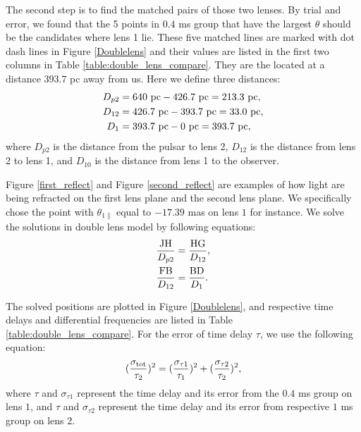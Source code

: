 \documentclass[useAMS,usenatbib]{mn2e}
\begin{document}
The second step is to find the matched pairs of those two lenses. By trial and error, we found that the 5 points in $0.4$ ms group that have the largest $\theta$ should be the candidates where lens 1 lie.  These five matched lines are marked with dot dash lines in Figure \ref{Doublelens} and their values are listed in the first two columns in Table \ref{table:double_lens_compare}. They are the located at a distance $393.7$ pc away from us. Here we define three distances:
\begin{equation}
\begin{aligned}
D_{p2}&=640~{\rm pc}-426.7~{\rm pc} =213.3~{\rm pc},\\
D_{12}&=426.7~{\rm pc}-393.7~{\rm pc} =33.0~{\rm pc},\\
D_{1}&=393.7~{\rm pc}- 0~{\rm pc} = 393.7~{\rm pc}, 
\end{aligned} 
\end{equation}
where $D_{p2}$ is the distance from the pulsar to lens 2, $D_{12}$ is the distance from lens 2 to lens 1, and $D_{10}$ is the distance from lens 1 to the observer.

Figure \ref{first_reflect} and Figure \ref{second_reflect} are examples of how light are being refracted on the first lens plane and the second lens plane. We specifically chose the point with $\theta_{1\parallel}$ equal to $-17.39$ mas on lens $1$ for instance. We solve the solutions in double lens model by following equations:
\begin{equation}
\begin{aligned}
\frac{\rm JH}{D_{p2}}&=\frac{\rm HG}{D_{12}},\\
\frac{\rm FB}{D_{12}}&=\frac{\rm BD}{D_{1}}.
\end{aligned}
\end{equation}

The solved positions are plotted in Figure \ref{Doublelens}, and respective time delays and differential frequencies are listed in Table \ref{table:double_lens_compare}. For the error of time delay $\tau$, we use the following equation: 
\begin{equation}
\begin{aligned}
(\frac{\sigma_{\rm tot}}{\tau_2})^2 = (\frac{\sigma_{\tau1}}{\tau_1})^2+(\frac{\sigma_{\tau2}}{\tau_2})^2,
\end{aligned}
\end{equation}
where $\tau$ and $\sigma_{\tau1}$ represent the time delay and its error from the $0.4$ ms group on lens $1$, and $\tau$ and $\sigma_{\tau2}$ represent the time delay and its error from respective $1$ ms group on lens 2.
\end{document}
